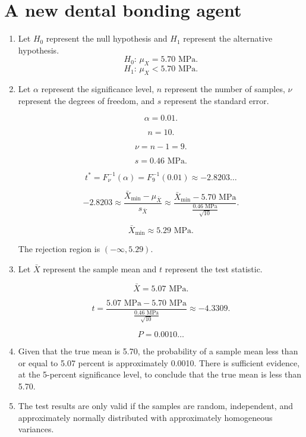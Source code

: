 \documentclass[12pt]{article}
\begin{document}
\section{A new dental bonding agent}
\begin{enumerate}
\item Let $H_0$ represent the null hypothesis and $H_1$ represent the alternative hypothesis.
\[H_0:\,\mu_X=5.70\text{ MPa}.\]
\[H_1:\,\mu_X<5.70\text{ MPa}.\]
\item Let $\alpha$ represent the significance level, $n$ represent the number of samples, $\nu$ represent the degrees of freedom, and $s$ represent the standard error.

\[\alpha=0.01.\]

\[n=10.\]

\[\nu=n-1=9.\]

\[s=0.46\text{ MPa}.\]

\[t^*=F^{-1}_\nu(\alpha)=F^{-1}_{9}(0.01)\approx -2.8203\dots\]

\[-2.8203\approx\frac{\bar{X}_{\text{min}}-\mu_{\bar{X}}}{s_{\bar{X}}}\approx\frac{\bar{X}_{\text{min}}-5.70\text{ MPa}}{\frac{0.46\text{ MPa}}{\sqrt{10}}}.\]

\[\bar{X}_{\text{min}}\approx 5.29\text{ MPa}.\]

The rejection region is $(-\infty,5.29)$.
\item Let $\bar{X}$ represent the sample mean and $t$ represent the test statistic.

\[\bar{X}=5.07\text{ MPa}.\]

\[t=\frac{5.07\text{ MPa}-5.70\text{ MPa}}{\frac{0.46\text{ MPa}}{\sqrt{10}}}\approx -4.3309.\]

\[P=0.0010\dots\]

\item Given that the true mean is 5.70, the probability of a sample mean less than or equal to 5.07 percent is approximately 0.0010. There is sufficient evidence, at the 5-percent significance level, to conclude that the true mean is less than 5.70.

\item The test results are only valid if the samples are random, independent, and approximately normally distributed with approximately homogeneous variances.
\end{enumerate}
\end{document}
